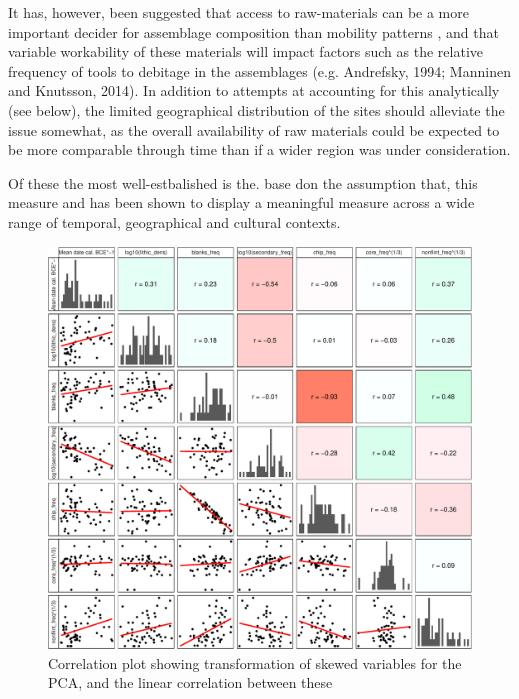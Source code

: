 \documentclass[
]{article}
\begin{document}
It has, however, been suggested that access to raw-materials can be a more important decider for assemblage composition than mobility patterns , and that variable workability of these materials will impact factors such as the relative frequency of tools to debitage in the assemblages (e.g. Andrefsky, 1994; Manninen and Knutsson, 2014). In addition to attempts at accounting for this analytically (see below), the limited geographical distribution of the sites should alleviate the issue somewhat, as the overall availability of raw materials could be expected to be more comparable through time than if a wider region was under consideration.

Of these the most well-estbalished is the. base don the assumption that, this measure and has been shown to display a meaningful measure across a wide range of temporal, geographical and cultural contexts.

\begin{figure}
\centering
\includegraphics{../figures/cor-plot-1.pdf}
\caption{\label{fig:cor-plot}Correlation plot showing transformation of skewed variables for the PCA, and the linear correlation between these}
\end{figure}
\end{document}
